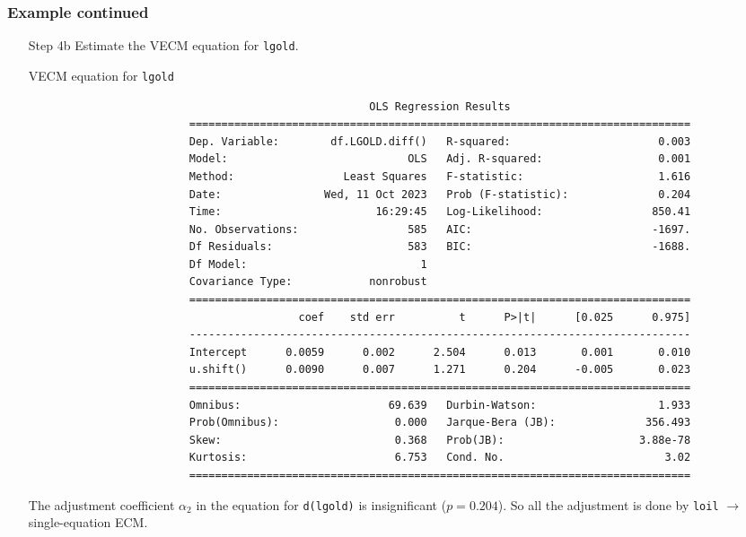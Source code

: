\begin{frame}[fragile]\frametitle{Example continued}
\begin{itemize}
\item[Step 4b] Estimate the VECM equation for \texttt{lgold}.
\begin{block}{VECM equation for \texttt{lgold}}
\tiny
\begin{verbatim}
                                                     OLS Regression Results
                         ==============================================================================
                         Dep. Variable:        df.LGOLD.diff()   R-squared:                       0.003
                         Model:                            OLS   Adj. R-squared:                  0.001
                         Method:                 Least Squares   F-statistic:                     1.616
                         Date:                Wed, 11 Oct 2023   Prob (F-statistic):              0.204
                         Time:                        16:29:45   Log-Likelihood:                 850.41
                         No. Observations:                 585   AIC:                            -1697.
                         Df Residuals:                     583   BIC:                            -1688.
                         Df Model:                           1
                         Covariance Type:            nonrobust
                         ==============================================================================
                                          coef    std err          t      P>|t|      [0.025      0.975]
                         ------------------------------------------------------------------------------
                         Intercept      0.0059      0.002      2.504      0.013       0.001       0.010
                         u.shift()      0.0090      0.007      1.271      0.204      -0.005       0.023
                         ==============================================================================
                         Omnibus:                       69.639   Durbin-Watson:                   1.933
                         Prob(Omnibus):                  0.000   Jarque-Bera (JB):              356.493
                         Skew:                           0.368   Prob(JB):                     3.88e-78
                         Kurtosis:                       6.753   Cond. No.                         3.02
                         ==============================================================================
\end{verbatim}
\end{block}
		The adjustment coefficient $\alpha_2$ in the equation for \texttt{d(lgold)} is insignificant ($p=0.204$). So all the adjustment is done by \texttt{loil} $\rightarrow$ single-equation ECM.
	\end{itemize}
\end{frame}
